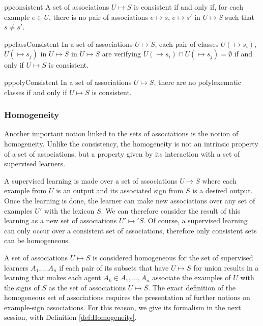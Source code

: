 \begin{restatable}[Consistency]{pp}{consistent}
\label{pp:consistent}
A set of associations $U \mapsto S$ is consistent if and only if, for each example $e \in U$, there is no pair of associations $e \mapsto s$, $e \mapsto s'$ in $U \mapsto S$ such that $s \neq s'$.
\end{restatable}

\begin{restatable}{pp}{classConsistent}
\label{pp:ClassConsistent}
In a set of associations $U \mapsto S$, each pair of classes $U(\mapsto s_{i})$, $U(\mapsto s_{j})$ in $U \mapsto S$ in $U \mapsto S$ are verifying $U(\mapsto s_{i}) \cap U(\mapsto s_{j}) = \emptyset$ if and only if $U \mapsto S$ is consistent.
\end{restatable}

\begin{restatable}{pp}{polyConsistent}
\label{pp:PolyConsistent}
In a set of associations $U \mapsto S$, there are no polylexematic classes if and only if $U \mapsto S$ is consistent.
\end{restatable}

\subsubsection{Homogeneity}
Another important notion linked to the sets of associations is the notion of homogeneity. Unlike the consistency, the homogeneity is not an intrinsic property of a set of associations, but a property given by its interaction with a set of supervised learners.

A supervised learning is made over a set of associations $U \mapsto S$ where each example from $U$ is an output and its associated sign from $S$ is a desired output. Once the learning is done, the learner can make new associations over any set of examples $U'$ with the lexicon $S$. We can therefore consider the result of this learning as a new set of associations $U' \mapsto' S$. Of course, a supervised learning can only occur over a consistent set of associations, therefore only consistent sets can be homogeneous.

A set of associations $U \mapsto S$ is considered homogeneous for the set of supervised learners $A_{1}, \ldots A_{n}$ if each pair of its subsets that have $U \mapsto S$ for union results in a learning that makes each agent $A_{k} \in A_{1}, \ldots, A_{n}$ associate the examples of $U$ with the signs of $S$ as the set of associations $U \mapsto S$.
The exact definition of the homogeneous set of associations requires the presentation of further notions on example-sign associations. For this reason, we give its formalism in the next session, with Definition \ref{def:Homogeneity}.

